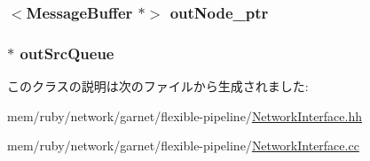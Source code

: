 \label{classNetworkInterface_a6175110fc176a7aeb64b1ea1df878c6f}
\hypertarget{classNetworkInterface_aff22e632df88a83fbcbac281efec0dcc}{
\subsubsection[{outNode\_\-ptr}]{$<${\bf MessageBuffer} $\ast$$>$ {\bf outNode\_\-ptr}}}
\label{classNetworkInterface_aff22e632df88a83fbcbac281efec0dcc}
\hypertarget{classNetworkInterface_a7c2f0247427488afa8f925d46c82195e}{
\subsubsection[{outSrcQueue}]{$\ast$ {\bf outSrcQueue}}}
\label{classNetworkInterface_a7c2f0247427488afa8f925d46c82195e}


このクラスの説明は次のファイルから生成されました:\begin{DoxyCompactItemize}
\item 
mem/ruby/network/garnet/flexible-\/pipeline/\hyperlink{NetworkInterface_8hh}{NetworkInterface.hh}\item 
mem/ruby/network/garnet/flexible-\/pipeline/\hyperlink{NetworkInterface_8cc}{NetworkInterface.cc}\end{DoxyCompactItemize}
